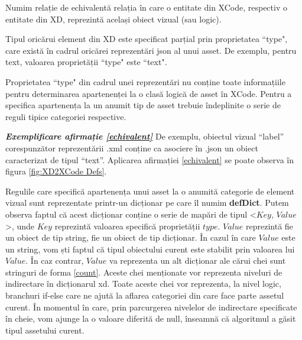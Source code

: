 \begin{mydef}\label{echivalent}
Numim relație de echivalentă relația în care o entitate din XCode, respectiv o entitate din XD, reprezintă același obiect vizual (sau logic).\\
\end{mydef}

\begin{myNote}\label{tip}
Tipul oricărui element din XD este specificat parțial prin proprietatea ``type", care există în cadrul oricărei reprezentări json al unui asset. De exemplu, pentru text, valoarea proprietății ``type" este ``text".\\
\end{myNote}

\begin{myNote}\label{echivalent}
Proprietatea ``type" din cadrul unei reprezentări nu conține toate informațiile pentru determinarea apartenenței la o clasă logică de asset în XCode. Pentru a specifica apartenența la un anumit tip de asset trebuie îndeplinite o serie de reguli tipice categoriei respective.\\
\end{myNote}

\textbf{\textit{Exemplificare afirmație \ref{echivalent}}} De exemplu, obiectul vizual “label” corespunzător reprezentării .xml conține ca asociere în .json un obiect caracterizat de tipul “text”. Aplicarea afirmației \ref{echivalent} se poate observa în figura \ref{fig:XD2XCode Defs}. 

Regulile care specifică apartenența unui asset la o anumită categorie de element vizual sunt reprezentate printr-un dicționar pe care îl numim \textbf{defDict}. Putem observa faptul că acest dicționar conține o serie de mapări de tipul <$Key$, $Value$>, unde $Key$ reprezintă valoarea specifică proprietății $type$. $Value$ reprezintă fie un obiect de tip string, fie un obiect de tip dicționar. În cazul în care $Value$ este un string, vom ști faptul că tipul obiectului curent este stabilit prin valoarea lui $Value$. În caz contrar, $Value$ va reprezenta un alt dicționar ale cărui chei sunt stringuri de forma \ref{count}. Aceste chei menționate vor reprezenta niveluri de indirectare în dicționarul xd. Toate aceste chei vor reprezenta, la nivel logic, branchuri if-else care ne ajută la aflarea categoriei din care face parte assetul curent. În momentul în care, prin parcurgerea nivelelor de indirectare specificate în cheie, vom ajunge la o valoare diferită de null, înseamnă că algoritmul a găsit tipul assetului curent.\\

